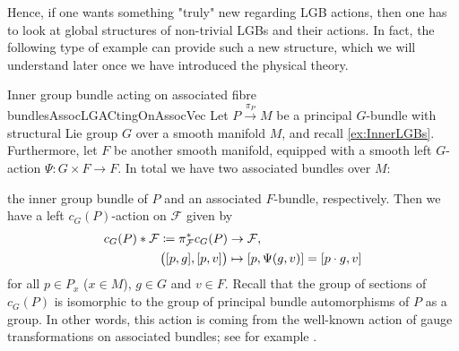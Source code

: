 \documentclass[reqno,a4paper,oneside]{amsart}
\theoremstyle{plain}
\theoremstyle{remark}
\theoremstyle{definition}
\begin{document}
Hence, if one wants something "truly" new regarding LGB actions, then one has to look at global structures of non-trivial LGBs and their actions. In fact, the following type of example can provide such a new structure, which we will understand later once we have introduced the physical theory.

\begin{examples}{Inner group bundle acting on associated fibre bundles}{AssocLGACtingOnAssocVec}
Let $P \stackrel{\pi_P}{\to} M$ be a principal $G$-bundle with structural Lie group $G$ over a smooth manifold $M$, and recall \ref{ex:InnerLGBs}. Furthermore, let $F$ be another smooth manifold, equipped with a smooth left $G$-action $\Psi \colon G \times F \to F$. In total we have two associated bundles over $M$: 
\begin{center}
\end{center}
the inner group bundle of $P$ and an associated $F$-bundle, respectively. Then we have a left $c_G(P)$-action on $\mathcal{F}$ given by
\begin{align*}
c_G(P) * \mathcal{F}
\coloneqq
\pi_{\mathcal{F}}^*c_G(P) &\to \mathcal{F},\\
\bigl( \mleft[ p, g \mright], \mleft[ p, v \mright] \bigr)
&\mapsto
\mleft[ p, \Psi \mleft(g, v\mright) \mright]
=
\mleft[ p \cdot g, v \mright]
\end{align*}
for all $p \in P_x$ ($x \in M$), $g \in G$ and $v \in F$. Recall that the group of sections of $c_G(P)$ is isomorphic to the group of principal bundle automorphisms of $P$ as a group. In other words, this action is coming from the well-known action of gauge transformations on associated bundles; see for example \cite[\S 5.3]{Hamilton}.
\end{examples}
\end{document}
